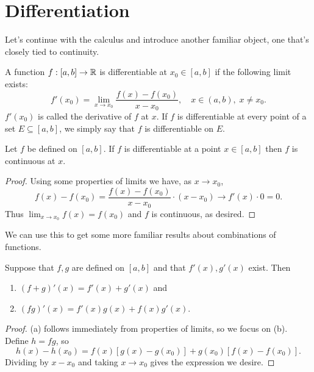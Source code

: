 \documentclass[../m131main.tex]{subfiles}
\begin{document}
\section{Differentiation}
Let's continue with the calculus and introduce another familiar object, one that's closely tied to continuity.

\begin{definition}[Derivative]
    A function $f : [a,b] \to \mathbb{R}$ is differentiable at $x_0 \in [a,b]$ if the following limit exists:
    \vspace{-2pt}
    \[ f'(x_0) = \lim_{x \to x_0} \frac{f(x) - f(x_0)}{x - x_0}, \quad x \in (a,b), \; x \neq x_0. \]
    \vspace{-2pt}
    $f'(x_0)$ is called the derivative of $f$ at $x$.
    If $f$ is differentiable at every point of a set $E \subseteq [a,b]$, we simply say that $f$ is differentiable on $E$.
\end{definition}

\begin{theorem} \label{thm:diff_imp_cont}
    Let $f$ be defined on $[a,b]$.
    If $f$ is differentiable at a point $x \in [a,b]$ then $f$ is continuous at $x$.
\end{theorem}

\begin{proof}
    Using some properties of limits we have, as $x \to x_0$,
    \vspace{-2pt}
    \[ f(x) - f(x_0) = \frac{f(x) - f(x_0)}{x - x_0} \cdot (x - x_0) \to f'(x) \cdot 0 = 0. \]
    \vspace{-2pt}
    Thus $\lim_{x \to x_0} f(x) = f(x_0)$ and $f$ is continuous, as desired.
\end{proof}

We can use this to get some more familiar results about combinations of functions.

\begin{theorem}[]
    Suppose that $f,g$ are defined on $[a,b]$ and that $f'(x), g'(x)$ exist.
    Then
    \begin{enumerate}[label=(\alph*)]
        \item $(f+g)'(x)= f'(x) + g'(x)$ and
        \item $(fg)'(x) = f'(x) g(x) + f(x)g'(x)$.
    \end{enumerate}
\end{theorem}

\begin{proof}
    (a) follows immediately from properties of limits, so we focus on (b).
    Define $h = fg$, so
    \[ h(x) - h(x_0) = f(x) [g(x) - g(x_0)] + g(x_0) [f(x) - f(x_0)]. \]
    Dividing by $x - x_0$ and taking $x \to x_0$ gives the expression we desire.
\end{proof}
\end{document}
